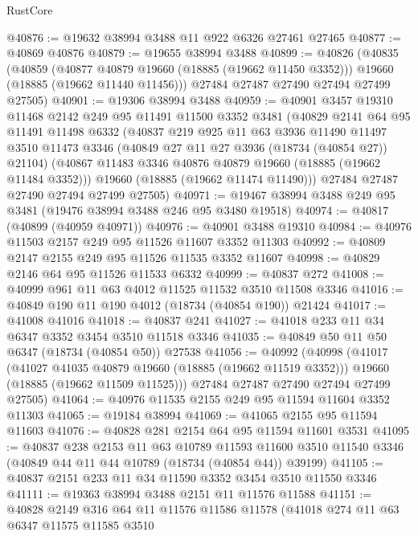 \begin{lexlean}{RustCore}
\begin{coremodule}
@40876 := @19632 @38994 @3488 @11 @922 @6326 @27461 @27465
@40877 := @40869 @40876
@40879 := @19655 @38994 @3488
@40899 := @40826
    (@40835
      (@40859
        (@40877 @40879 @19660 (@18885 (@19662 @11450 @3352)))
        @19660
        (@18885 (@19662 @11440 @11456)))
      @27484
      @27487
      @27490
      @27494
      @27499
      @27505)
@40901 := @19306 @38994 @3488
@40959 := @40901
    @3457
    @19310
    @11468
    @2142
    @249
    @95
    @11491
    @11500
    @3352
    @3481
    (@40829
      @2141
      @64
      @95
      @11491
      @11498
      @6332
      (@40837
        @219
        @925
        @11
        @63
        @3936
        @11490
        @11497
        @3510
        @11473
        @3346
        (@40849 @27 @11 @27 @3936 (@18734 (@40854 @27)) @21104)
        (@40867 @11483 @3346 @40876 @40879 @19660 (@18885 (@19662 @11484 @3352)))
        @19660
        (@18885 (@19662 @11474 @11490)))
      @27484
      @27487
      @27490
      @27494
      @27499
      @27505)
@40971 := @19467 @38994 @3488 @249 @95 @3481 (@19476 @38994 @3488 @246 @95 @3480 @19518)
@40974 := @40817 (@40899 (@40959 @40971))
@40976 := @40901 @3488 @19310
@40984 := @40976 @11503 @2157 @249 @95 @11526 @11607 @3352 @11303
@40992 := @40809 @2147 @2155 @249 @95 @11526 @11535 @3352 @11607
@40998 := @40829 @2146 @64 @95 @11526 @11533 @6332
@40999 := @40837 @272
@41008 := @40999 @961 @11 @63 @4012 @11525 @11532 @3510 @11508 @3346
@41016 := @40849 @190 @11 @190 @4012 (@18734 (@40854 @190)) @21424
@41017 := @41008 @41016
@41018 := @40837 @241
@41027 := @41018 @233 @11 @34 @6347 @3352 @3454 @3510 @11518 @3346
@41035 := @40849 @50 @11 @50 @6347 (@18734 (@40854 @50)) @27538
@41056 := @40992
    (@40998
      (@41017
        (@41027 @41035 @40879 @19660 (@18885 (@19662 @11519 @3352)))
        @19660
        (@18885 (@19662 @11509 @11525)))
      @27484
      @27487
      @27490
      @27494
      @27499
      @27505)
@41064 := @40976 @11535 @2155 @249 @95 @11594 @11604 @3352 @11303
@41065 := @19184 @38994
@41069 := @41065 @2155 @95 @11594 @11603
@41076 := @40828 @281 @2154 @64 @95 @11594 @11601 @3531
@41095 := @40837
    @238
    @2153
    @11
    @63
    @10789
    @11593
    @11600
    @3510
    @11540
    @3346
    (@40849 @44 @11 @44 @10789 (@18734 (@40854 @44)) @39199)
@41105 := @40837 @2151 @233 @11 @34 @11590 @3352 @3454 @3510 @11550 @3346
@41111 := @19363 @38994 @3488 @2151 @11 @11576 @11588
@41151 := @40828
    @2149
    @316
    @64
    @11
    @11576
    @11586
    @11578
    (@41018
      @274
      @11
      @63
      @6347
      @11575
      @11585
      @3510

\end{coremodule}
\end{lexlean}
